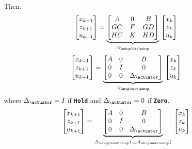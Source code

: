 Then:
\begin{equation}
    \begin{bmatrix}
        x_{k+1} \\
        z_{k+1} \\
        u_{k+1} \\
    \end{bmatrix} = \underbrace{\begin{bmatrix}
        A  & 0  & B \\
        GC & F & GD \\
        HC & K & HD \\
    \end{bmatrix}}_{A_{\ndrop\hit\ndrop}}\, \begin{bmatrix}
        x_{k} \\
        z_{k} \\
        u_{k} \\
    \end{bmatrix}
\end{equation}
%
\begin{equation}
    \begin{bmatrix}
        x_{k+1} \\
        z_{k+1} \\
        u_{k+1} \\
    \end{bmatrix} = \underbrace{\begin{bmatrix}
        A & 0 & B \\
        0 & I & 0 \\
        0 & 0 & \Delta_\actuator \\
    \end{bmatrix}}_{A_{\drop\unkn\ndrop}}\, \begin{bmatrix}
        x_{k} \\
        z_{k} \\
        u_{k} \\
    \end{bmatrix}
\end{equation}
%
where $\Delta_\actuator = I$ if \textbf{\texttt{Hold}} and $\Delta_\actuator = 0$ if \textbf{\texttt{Zero}}.
%
\begin{equation}
    \begin{bmatrix}
        x_{k+1} \\
        z_{k+1} \\
        u_{k+1} \\
    \end{bmatrix} = \underbrace{\begin{bmatrix}
        A & 0 & B \\
        0 & I & 0 \\
        0 & 0 & \Delta_\actuator \\
    \end{bmatrix}}_{A_{\ndrop\miss\ndrop}\, (\equiv A_{\drop\unkn\ndrop})}\, \begin{bmatrix}
        x_{k} \\
        z_{k} \\
        u_{k} \\
    \end{bmatrix}
\end{equation}
